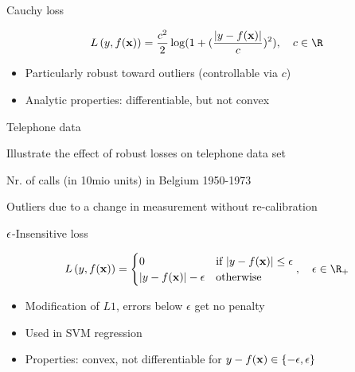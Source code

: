 \documentclass[11pt,compress,t,notes=noshow, xcolor=table]{beamer}
\begin{document}
\begin{frame}{Cauchy loss}


$$
\Lxy = \frac{c^2}{2} \log ( 1 + ( \frac{\left|y - \fx\right|}{c})^2 ), 
\quad c \in \R
$$

\begin{itemize}
\item Particularly robust toward outliers (controllable via $c$)
\item Analytic properties: differentiable, but not convex
\end{itemize}

\vfill




\end{frame}

\begin{framei}[sep=M]{Telephone data}

\item Illustrate the effect of robust losses on telephone data set 
\item Nr. of calls (in 10mio units) in Belgium 1950-1973
\item Outliers due to a change in measurement without re-calibration 

\vfill



\end{framei}


\begin{frame}{$\epsilon$-Insensitive loss}

$$
\Lxy =  \begin{cases}
  0  & \text{if } |y - \fx| \le \epsilon \\
  |y - \fx|-\epsilon & \text{otherwise }
  \end{cases}, \quad \epsilon \in \R_{+}
$$

\begin{itemize}
\item Modification of $L1$, errors below $\epsilon$ get no penalty
\item Used in SVM regression
\item Properties: convex, not differentiable for $ y - f(\mathbf{x}) \in \{-\epsilon, \epsilon\}$
\end{itemize}

\vfill




\end{frame}
\end{document}
